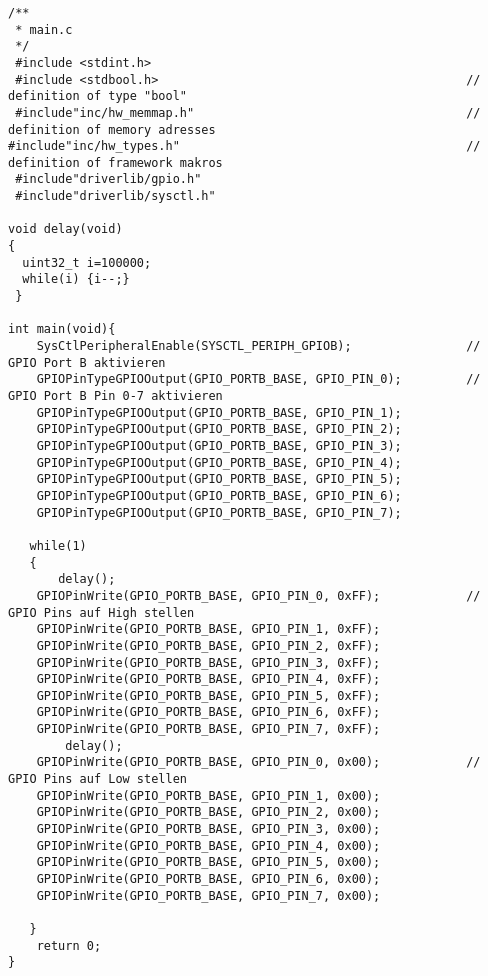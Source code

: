 \subsubsection{}
\begin{lstlisting}
/**
 * main.c
 */
 #include <stdint.h>
 #include <stdbool.h>                                           // definition of type "bool"
 #include"inc/hw_memmap.h"                                      // definition of memory adresses
#include"inc/hw_types.h"                                        // definition of framework makros
 #include"driverlib/gpio.h"
 #include"driverlib/sysctl.h"

void delay(void)
{
  uint32_t i=100000;
  while(i) {i--;}
 }

int main(void){
    SysCtlPeripheralEnable(SYSCTL_PERIPH_GPIOB);                // GPIO Port B aktivieren
    GPIOPinTypeGPIOOutput(GPIO_PORTB_BASE, GPIO_PIN_0);         // GPIO Port B Pin 0-7 aktivieren
    GPIOPinTypeGPIOOutput(GPIO_PORTB_BASE, GPIO_PIN_1);
    GPIOPinTypeGPIOOutput(GPIO_PORTB_BASE, GPIO_PIN_2);
    GPIOPinTypeGPIOOutput(GPIO_PORTB_BASE, GPIO_PIN_3);
    GPIOPinTypeGPIOOutput(GPIO_PORTB_BASE, GPIO_PIN_4);
    GPIOPinTypeGPIOOutput(GPIO_PORTB_BASE, GPIO_PIN_5);
    GPIOPinTypeGPIOOutput(GPIO_PORTB_BASE, GPIO_PIN_6);
    GPIOPinTypeGPIOOutput(GPIO_PORTB_BASE, GPIO_PIN_7);

   while(1)
   {
       delay();
    GPIOPinWrite(GPIO_PORTB_BASE, GPIO_PIN_0, 0xFF);            // GPIO Pins auf High stellen
    GPIOPinWrite(GPIO_PORTB_BASE, GPIO_PIN_1, 0xFF);
    GPIOPinWrite(GPIO_PORTB_BASE, GPIO_PIN_2, 0xFF);
    GPIOPinWrite(GPIO_PORTB_BASE, GPIO_PIN_3, 0xFF);
    GPIOPinWrite(GPIO_PORTB_BASE, GPIO_PIN_4, 0xFF);
    GPIOPinWrite(GPIO_PORTB_BASE, GPIO_PIN_5, 0xFF);
    GPIOPinWrite(GPIO_PORTB_BASE, GPIO_PIN_6, 0xFF);
    GPIOPinWrite(GPIO_PORTB_BASE, GPIO_PIN_7, 0xFF);
        delay();
    GPIOPinWrite(GPIO_PORTB_BASE, GPIO_PIN_0, 0x00);            // GPIO Pins auf Low stellen
    GPIOPinWrite(GPIO_PORTB_BASE, GPIO_PIN_1, 0x00);
    GPIOPinWrite(GPIO_PORTB_BASE, GPIO_PIN_2, 0x00);
    GPIOPinWrite(GPIO_PORTB_BASE, GPIO_PIN_3, 0x00);
    GPIOPinWrite(GPIO_PORTB_BASE, GPIO_PIN_4, 0x00);
    GPIOPinWrite(GPIO_PORTB_BASE, GPIO_PIN_5, 0x00);
    GPIOPinWrite(GPIO_PORTB_BASE, GPIO_PIN_6, 0x00);
    GPIOPinWrite(GPIO_PORTB_BASE, GPIO_PIN_7, 0x00);

   }
    return 0;
}
\end{lstlisting}

\subsubsection{}


